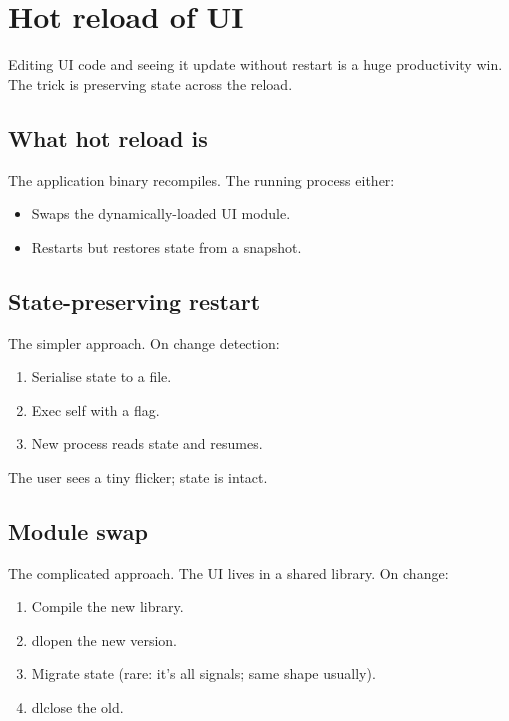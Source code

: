 \chapter{Hot reload of UI}
\label{ch:hotreload}

\begin{aside}
Editing UI code and seeing it update without restart is a
huge productivity win. The trick is preserving state across
the reload.
\end{aside}

\section{What hot reload is}

The application binary recompiles. The running process
either:

\begin{itemize}[leftmargin=*]
  \item Swaps the dynamically-loaded UI module.
  \item Restarts but restores state from a snapshot.
\end{itemize}

\section{State-preserving restart}

The simpler approach. On change detection:

\begin{enumerate}[leftmargin=*]
  \item Serialise state to a file.
  \item Exec self with a flag.
  \item New process reads state and resumes.
\end{enumerate}

The user sees a tiny flicker; state is intact.

\section{Module swap}

The complicated approach. The UI lives in a shared library.
On change:

\begin{enumerate}[leftmargin=*]
  \item Compile the new library.
  \item dlopen the new version.
  \item Migrate state (rare: it's all signals; same shape
    usually).
  \item dlclose the old.
\end{enumerate}

